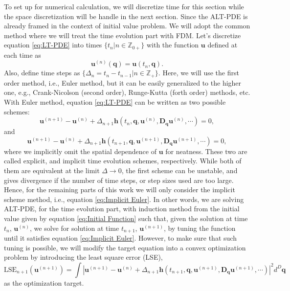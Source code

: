 \documentclass[preprint, 12pt]{revtex4-2}
\numberwithin{equation}{section}
\begin{document}
To set up for numerical calculation, we will discretize time for this section while the space discretization will be handle in the next section. Since the ALT-PDE is already framed in the context of initial value problem. We will adopt the common method where we will treat the time evolution part with FDM. Let's discretize equation \ref{eq:LT-PDE} into times $\{t_n|n\in\mathbb{Z}_{0+}\}$ with the function $\mathbf{u}$ defined at each time as
\begin{equation}\label{eq:Discretized Function}
    \mathbf{u}^{(n)}(\mathbf{q}) = \mathbf{u}(t_n, \mathbf{q}).
\end{equation} 
Also, define time steps as $\{\Delta_n=t_n-t_{n-1}|n\in\mathbb{Z}_{+}\}$. Here, we will use the first order method, i.e., Euler method, but it can be easily generalized to the higher one, e.g., Crank-Nicolson (second order), Runge-Kutta (forth order) methods, etc. With Euler method, equation \ref{eq:LT-PDE} can be written as two possible schemes:
\begin{equation}\label{eq:Explicit Euler}
    \mathbf{u}^{(n+1)} - \mathbf{u}^{(n)} + \Delta_{n+1}\mathbf{h}(t_{n}, \mathbf{q}, \mathbf{u}^{(n)}, \mathbf{D}_\mathbf{q}\mathbf{u}^{(n)}, \cdots) = 0,
\end{equation}
and
\begin{equation}\label{eq:Implicit Euler}
    \mathbf{u}^{(n+1)} - \mathbf{u}^{(n)} + \Delta_{n+1}\mathbf{h}(t_{n+1}, \mathbf{q}, \mathbf{u}^{(n+1)}, \mathbf{D}_\mathbf{q}\mathbf{u}^{(n+1)}, \cdots) = 0,
\end{equation}
where we implicitly omit the spatial dependence of $\mathbf{u}$ for neatness. These two are called explicit, and implicit time evolution schemes, respectively. While both of them are equivalent at the limit $\Delta\rightarrow0$, the first scheme can be unstable, and gives divergence if the number of time steps, or step sizes used are too large. Hence, for the remaining parts of this work we will only consider the implicit scheme method, i.e., equation \ref{eq:Implicit Euler}. In other words, we are solving ALT-PDE, for the time evolution part, with induction method from the initial value given by equation \ref{eq:Initial Function} such that, given the solution at time $t_n$, $\mathbf{u}^{(n)}$, we solve for solution at time $t_{n+1}$, $\mathbf{u}^{(n+1)}$, by tuning the function until it satisfies equation \ref{eq:Implicit Euler}. However, to make sure that such tuning is possible, we will modify the target equation into a convex optimization problem by introducing the least square error (LSE), 
\begin{equation}\label{eq:LSE}
    \text{LSE}_{n+1}(\mathbf{u}^{(n+1)}) = \int \left|\mathbf{u}^{(n+1)} - \mathbf{u}^{(n)} + \Delta_{n+1}\mathbf{h}(t_{n+1}, \mathbf{q}, \mathbf{u}^{(n+1)}, \mathbf{D}_\mathbf{q}\mathbf{u}^{(n+1)}, \cdots)\right|^2 d^D\mathbf{q}
\end{equation}
as the optimization target.
\end{document}
